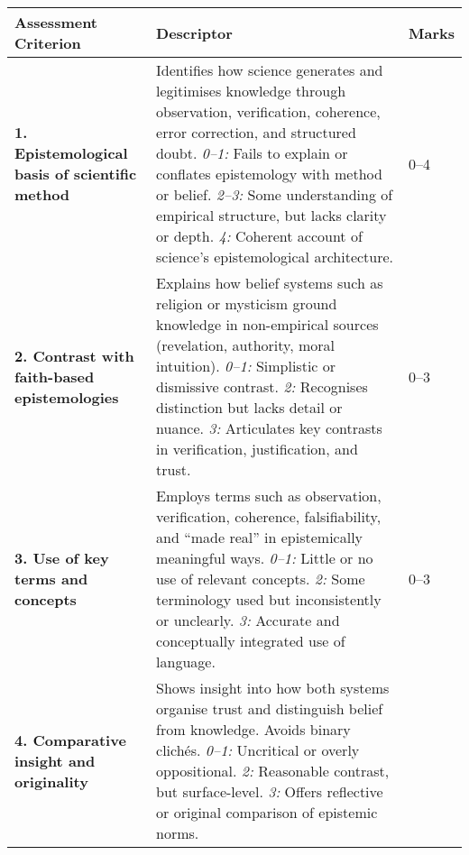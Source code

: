\documentclass[
  10t,
]{article}
\begin{document}
\begin{small}
\begin{raggedright}
\begin{longtable*}{|p{4.2cm}|p{9cm}|p{1.8cm}|}
\hline
\textbf{Assessment Criterion} & \textbf{Descriptor} & \textbf{Marks} \\
\hline
\textbf{1. Epistemological basis of scientific method} & 
Identifies how science generates and legitimises knowledge through observation, verification, coherence, error correction, and structured doubt. \newline
\textit{0–1:} Fails to explain or conflates epistemology with method or belief. \newline
\textit{2–3:} Some understanding of empirical structure, but lacks clarity or depth. \newline
\textit{4:} Coherent account of science’s epistemological architecture. & 
0–4 \\
\hline
\textbf{2. Contrast with faith-based epistemologies} & 
Explains how belief systems such as religion or mysticism ground knowledge in non-empirical sources (revelation, authority, moral intuition). \newline
\textit{0–1:} Simplistic or dismissive contrast. \newline
\textit{2:} Recognises distinction but lacks detail or nuance. \newline
\textit{3:} Articulates key contrasts in verification, justification, and trust. & 
0–3 \\
\hline
\textbf{3. Use of key terms and concepts} & 
Employs terms such as observation, verification, coherence, falsifiability, and “made real” in epistemically meaningful ways. \newline
\textit{0–1:} Little or no use of relevant concepts. \newline
\textit{2:} Some terminology used but inconsistently or unclearly. \newline
\textit{3:} Accurate and conceptually integrated use of language. & 
0–3 \\
\hline
\textbf{4. Comparative insight and originality} & 
Shows insight into how both systems organise trust and distinguish belief from knowledge. Avoids binary clichés. \newline
\textit{0–1:} Uncritical or overly oppositional. \newline
\textit{2:} Reasonable contrast, but surface-level. \newline
\textit{3:} Offers reflective or original comparison of epistemic norms. & 

\end{longtable*}
\end{raggedright}
\end{small}
\end{document}
